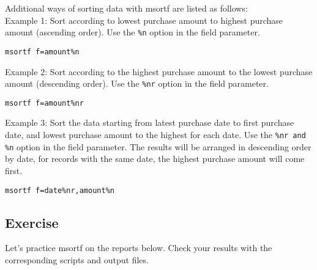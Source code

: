 \noindent
Additional ways of sorting data with msortf are listed as follows:  \\

Example 1: Sort according to lowest purchase amount to highest purchase amount (ascending order). Use the \verb|%n| option in the field parameter. 
\begin{verbatim}
msortf f=amount%n
\end{verbatim}

Example 2: Sort according to the highest purchase amount to the lowest purchase amount (descending order). Use the \verb|%nr| option in the field parameter. 
\begin{verbatim}
msortf f=amount%nr
\end{verbatim}

Example 3: Sort the data starting from latest purchase date to first purchase date, and lowest purchase amount to the highest for each date. Use the \verb|%nr and %n| option in the field parameter. The results will be arranged in descending order by date, for records with the same date, the highest purchase amount will come first.  
\begin{verbatim}
msortf f=date%nr,amount%n
\end{verbatim}

\newpage

\subsection{Exercise }

Let's practice msortf on the reports below. Check your results with the corresponding scripts and output files. 

